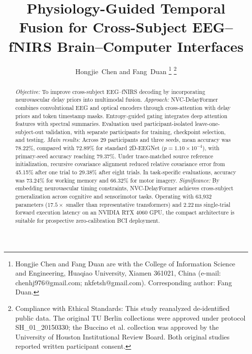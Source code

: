 \documentclass[journal]{IEEEtran}
\begin{document}
\title{Physiology-Guided Temporal Fusion for Cross-Subject EEG--fNIRS Brain--Computer Interfaces}

\author{Hongjie~Chen and Fang~Duan%
\thanks{Hongjie Chen and Fang Duan are with the College of Information Science and Engineering, Huaqiao University, Xiamen 361021, China (e-mail: chenhj976@gmail.com; nkfetsh@gmail.com). Corresponding author: Fang Duan.}%
\thanks{Compliance with Ethical Standards: This study reanalyzed de-identified public data. The original TU Berlin collections were approved under protocol SH\_01\_20150330; the Buccino et al. collection was approved by the University of Houston Institutional Review Board. Both original studies reported written participant consent.}%
}


\maketitle

\begin{abstract}
\textit{Objective:} To improve cross-subject EEG--fNIRS decoding by incorporating neurovascular delay priors into multimodal fusion.
\textit{Approach:} NVC-DelayFormer combines convolutional EEG and optical encoders through cross-attention with delay priors and token timestamp masks. Entropy-guided gating integrates deep attention features with spectral summaries. Evaluation used participant-isolated leave-one-subject-out validation, with separate participants for training, checkpoint selection, and testing.
\textit{Main results:} Across 29 participants and three seeds, mean accuracy was 78.22\%, compared with 72.89\% for standard 2D-EEGNet ($p = 1.10\times 10^{-4}$), with primary-seed accuracy reaching 79.37\%. Under trace-matched source reference initialization, recursive covariance alignment reduced relative covariance error from 45.15\% after one trial to 29.38\% after eight trials. In task-specific evaluations, accuracy was 73.24\% for working memory and 66.32\% for motor imagery.
\textit{Significance:} By embedding neurovascular timing constraints, NVC-DelayFormer achieves cross-subject generalization across cognitive and sensorimotor tasks. Operating with 63,932 parameters ($17.5\times$ smaller than representative transformers) and 2.22\,ms single-trial forward execution latency on an NVIDIA RTX 4060 GPU, the compact architecture is suitable for prospective zero-calibration BCI deployment.
\end{abstract}
\end{document}
